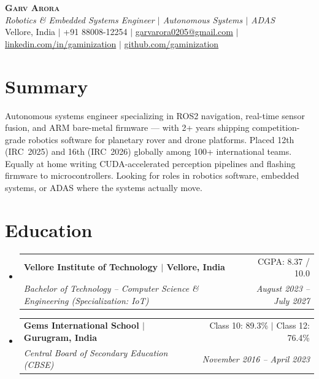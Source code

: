 \documentclass[letterpaper,10pt]{article}
\makeatletter
\newcommand{\resumeSubheading}[4]{
  \item
    \begin{tabular*}{0.97\textwidth}[t]{l@{\extracolsep{\fill}}r}
      \textbf{#1} & #2 \\
      \textit{\small#3} & \textit{\small #4} \\
    \end{tabular*}\vspace{-4pt}
}
\newcommand{\resumeSubHeadingListStart}{
  \begin{itemize}[leftmargin=0.15in, label={}, itemsep=4pt, parsep=0pt, topsep=2pt]
}
\newcommand{\resumeSubHeadingListEnd}{\end{itemize}}
\makeatother
\begin{document}
\begin{center}
    \textbf{\Huge \scshape Garv Arora} \\ \vspace{2pt}
    \small\textit{Robotics \& Embedded Systems Engineer $|$ Autonomous Systems $|$ ADAS} \\ \vspace{2pt}
    \small Vellore, India $|$
    +91 88008-12254 $|$
    \href{mailto:garvarora0205@gmail.com}{garvarora0205@gmail.com} $|$
    \href{https://linkedin.com/in/gaminization}{linkedin.com/in/gaminization} $|$
    \href{https://github.com/gaminization}{github.com/gaminization}
\end{center}

\section{Summary}
\vspace{1pt}
\small{Autonomous systems engineer specializing in ROS2 navigation, real-time sensor fusion, and ARM bare-metal firmware --- with 2+ years shipping competition-grade robotics software for planetary rover and drone platforms. Placed 12th (IRC~2025) and 16th (IRC~2026) globally among 100+ international teams. Equally at home writing CUDA-accelerated perception pipelines and flashing firmware to microcontrollers. Looking for roles in robotics software, embedded systems, or ADAS where the systems actually move.}

\section{Education}
  \resumeSubHeadingListStart
    \resumeSubheading
      {Vellore Institute of Technology $|$ Vellore, India}{CGPA: 8.37 / 10.0}
      {Bachelor of Technology -- Computer Science \& Engineering (Specialization: IoT)}{August 2023 -- July 2027}
    \resumeSubheading
      {Gems International School $|$ Gurugram, India}{Class 10: 89.3\% $|$ Class 12: 76.4\%}
      {Central Board of Secondary Education (CBSE)}{November 2016 -- April 2023}
  \resumeSubHeadingListEnd

\end{document}
